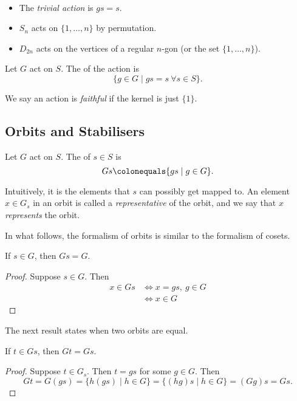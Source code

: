 \begin{example} \
\begin{itemize}
\item The \emph{trivial action} is $gs=s$.
\item $S_n$ acts on $\{1,\dots,n\}$ by permutation.
\item $D_{2n}$ acts on the vertices of a regular $n$-gon (or the set $\{1,\dots,n\}$).
\end{itemize}
\end{example}

\begin{definition}
Let $G$ act on $S$. The  of the action is
\[\{g\in G\mid gs=s\:\forall s\in S\}.\]
\end{definition}

We say an action is \emph{faithful} if the kernel is just $\{1\}$.

\subsection{Orbits and Stabilisers}
\begin{definition}[Orbit]
Let $G$ act on $S$. The  of $s\in S$ is
\[Gs\colonequals\{gs\mid g\in G\}.\]
\end{definition}

Intuitively, it is the elements that $s$ can possibly get mapped to.
An element $x\in G_s$ in an orbit is called a \emph{representative} of the orbit, and we say that $x$ \emph{represents} the orbit.

In what follows, the formalism of orbits is similar to the formalism of cosets.

\begin{lemma}
If $s\in G$, then $Gs=G$.
\end{lemma}

\begin{proof}
Suppose $s\in G$. Then
\begin{align*}
x\in Gs
&\iff x=gs,\:g\in G\\
&\iff x\in G
\end{align*}
\end{proof}

The next result states when two orbits are equal.

\begin{lemma}
If $t\in Gs$, then $Gt=Gs$.
\end{lemma}

\begin{proof}
Suppose $t\in G_s$. Then $t=gs$ for some $g\in G$. Then
\[Gt=G(gs)=\{h(gs)\mid h\in G\}=\{(hg)s\mid h\in G\}=(Gg)s=Gs.\]
\end{proof}

